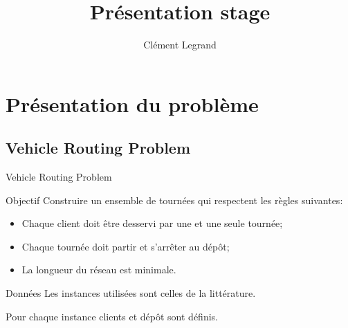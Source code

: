 \documentclass{beamer}
\title{Présentation stage}
\author{Clément Legrand}
\begin{document}
\begin{frame}[plain]
\titlepage
\end{frame}

\section{Présentation du problème}

\subsection{Vehicle Routing Problem}

\begin{frame}{Vehicle Routing Problem}
\begin{block}{Objectif}
Construire un ensemble de tournées qui respectent les règles suivantes:
\begin{itemize}
\item Chaque client doit être desservi par une et une seule tournée;
\item Chaque tournée doit partir et s'arrêter au dépôt;
\item La longueur du réseau est minimale.
\end{itemize}
\end{block}

\begin{block}{Données}
Les instances utilisées sont celles de la littérature. 

Pour chaque instance clients et dépôt sont définis.

\end{block}

\end{frame}
\end{document}
